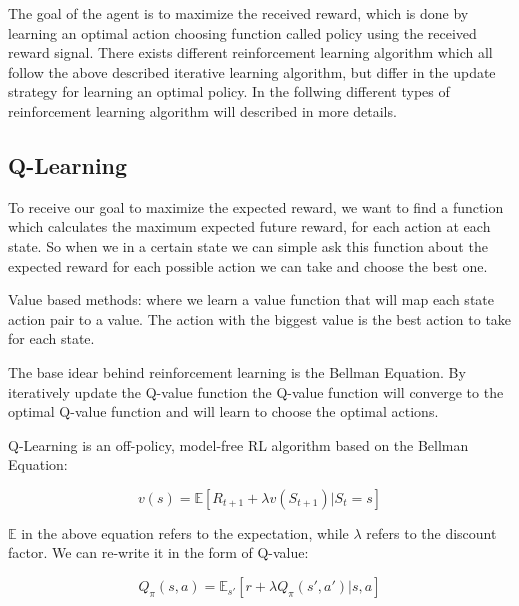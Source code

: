
The goal of the agent is to maximize the received reward, which is done by learning an optimal action choosing function called policy using the received reward signal.
There exists different reinforcement learning algorithm which all follow the above described iterative learning algorithm, but differ in the update strategy for learning an optimal policy. In the follwing different types of reinforcement learning algorithm will described in more details.

\subsection{Q-Learning}

To receive our goal to maximize the expected reward, we want to find a function which calculates the maximum expected future reward, for each action at each state. So when we in a certain state we can simple ask this function about the expected reward for each possible action we can take and choose the best one.

Value based methods: where we learn a value function that will map each state action pair to a value. The action with the biggest value is the best action to take for each state.

The base idear behind reinforcement learning is the Bellman Equation. By iteratively update the Q-value function the Q-value function will converge to the optimal Q-value function and will learn to choose the optimal actions. 

Q-Learning is an off-policy, model-free RL algorithm based on the Bellman Equation:

\begin{equation}
v(s) = \mathbb{E} [R_{t+1} + \lambda v(S_{t+1}) | S_t = s]
\end{equation}

$\mathbb{E}$ in the above equation refers to the expectation, while $\lambda$ refers to the discount factor. We can re-write it in the form of Q-value:

\begin{equation}
Q_{\pi} (s, a) =\mathbb{E}_{s'} [r + \lambda Q_\pi(s', a') | s, a]
\end{equation}


